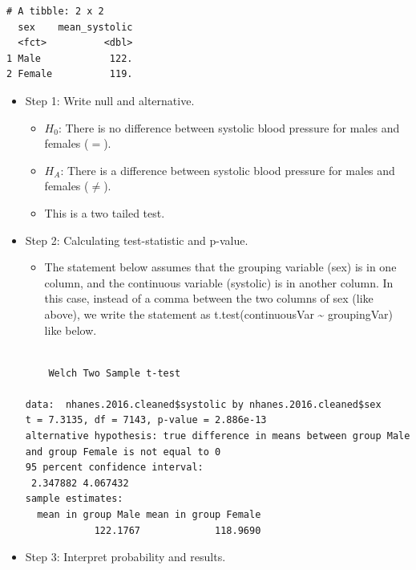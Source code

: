 \documentclass[
  letterpaper,
  DIV=11,
  numbers=noendperiod]{scrreprt}
\newenvironment{Shaded}{\begin{snugshade}}{\end{snugshade}}
\newcommand{\CommentTok}[1]{\textcolor[rgb]{0.37,0.37,0.37}{#1}}
\newcommand{\FloatTok}[1]{\textcolor[rgb]{0.68,0.00,0.00}{#1}}
\newcommand{\FunctionTok}[1]{\textcolor[rgb]{0.28,0.35,0.67}{#1}}
\newcommand{\NormalTok}[1]{\textcolor[rgb]{0.00,0.23,0.31}{#1}}
\newcommand{\SpecialCharTok}[1]{\textcolor[rgb]{0.37,0.37,0.37}{#1}}
\providecommand{\tightlist}{%
  \setlength{\itemsep}{0pt}\setlength{\parskip}{0pt}}\usepackage{longtable,booktabs,array}
\begin{document}
\begin{verbatim}
# A tibble: 2 x 2
  sex    mean_systolic
  <fct>          <dbl>
1 Male            122.
2 Female          119.
\end{verbatim}

\begin{itemize}
\item
  Step 1: Write null and alternative.

  \begin{itemize}
  \tightlist
  \item
    \(H_0\): There is no difference between systolic blood pressure for
    males and females (\(=\)).
  \item
    \(H_A\): There is a difference between systolic blood pressure for
    males and females (\(\neq\)).
  \item
    This is a two tailed test.
  \end{itemize}
\item
  Step 2: Calculating test-statistic and p-value.

  \begin{itemize}
  \tightlist
  \item
    The statement below assumes that the grouping variable (sex) is in
    one column, and the continuous variable (systolic) is in another
    column. In this case, instead of a comma between the two columns of
    sex (like above), we write the statement as t.test(continuousVar
    \textasciitilde{} groupingVar) like below.
  \end{itemize}

\begin{Shaded}
\end{Shaded}

\begin{verbatim}

    Welch Two Sample t-test

data:  nhanes.2016.cleaned$systolic by nhanes.2016.cleaned$sex
t = 7.3135, df = 7143, p-value = 2.886e-13
alternative hypothesis: true difference in means between group Male and group Female is not equal to 0
95 percent confidence interval:
 2.347882 4.067432
sample estimates:
  mean in group Male mean in group Female 
            122.1767             118.9690 
\end{verbatim}
\item
  Step 3: Interpret probability and results.


\end{itemize}
\end{document}
